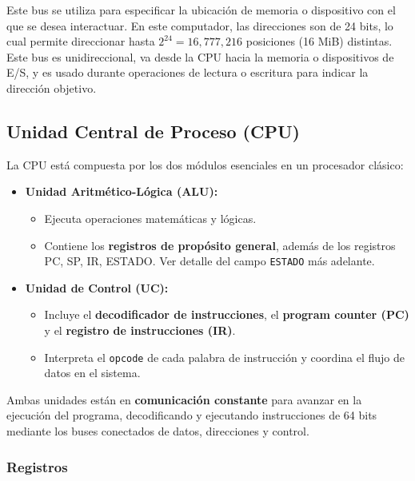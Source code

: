 \documentclass{article}
\begin{document}
Este bus se utiliza para especificar la ubicación de memoria o 
dispositivo con el que se desea interactuar. En este computador, las 
direcciones son de 24 bits, lo cual permite direccionar hasta 
$2^{24} = 16,\!777,\!216$ posiciones (16 MiB) distintas. 
Este bus es unidireccional, va desde la CPU hacia la memoria o 
dispositivos de E/S, y es usado durante operaciones de lectura o 
escritura para indicar la dirección objetivo.


\subsection{Unidad Central de Proceso (CPU)}

La CPU está compuesta por los dos módulos esenciales en un procesador clásico:

\begin{itemize}
    \item \textbf{Unidad Aritmético-Lógica (ALU):}
    \begin{itemize}
        \item Ejecuta operaciones matemáticas y lógicas.
        \item Contiene los \textbf{registros de propósito general}, además de los registros PC, SP, IR, ESTADO. Ver detalle del campo \texttt{ESTADO} más adelante.
    \end{itemize}
    \item \textbf{Unidad de Control (UC):}
    \begin{itemize}
        \item Incluye el \textbf{decodificador de instrucciones}, el \textbf{program counter (PC)} y el \textbf{registro de instrucciones (IR)}.
        \item Interpreta el \texttt{opcode} de cada palabra de instrucción y coordina el flujo de datos en el sistema.
    \end{itemize}
\end{itemize}

Ambas unidades están en \textbf{comunicación constante} para avanzar en la ejecución del programa, decodificando y ejecutando instrucciones de 64 bits mediante los buses conectados de datos, direcciones y control.

\subsubsection{Registros}
\end{document}
